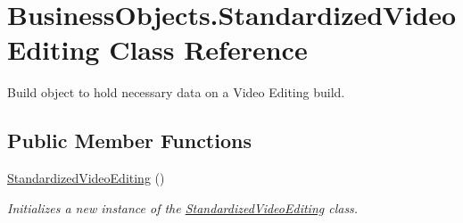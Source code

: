 \hypertarget{class_business_objects_1_1_standardized_video_editing}{}\section{Business\+Objects.\+Standardized\+Video\+Editing Class Reference}
\label{class_business_objects_1_1_standardized_video_editing}


Build object to hold necessary data on a Video Editing build.  


\subsection*{Public Member Functions}
\begin{DoxyCompactItemize}
\item 
\hyperlink{class_business_objects_1_1_standardized_video_editing_a3eb654cddfbf6c70a795b41373585a22}{Standardized\+Video\+Editing} ()
\begin{DoxyCompactList}\small\item\em Initializes a new instance of the \hyperlink{class_business_objects_1_1_standardized_video_editing}{Standardized\+Video\+Editing} class. \end{DoxyCompactList}\end{DoxyCompactItemize}
